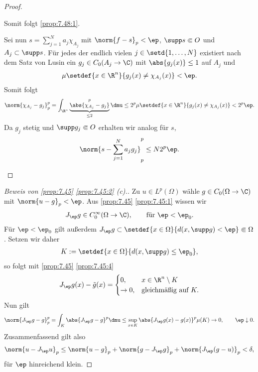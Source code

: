 \begin{proof}
\begin{proofenum}
Somit folgt \ref{prop:7.48:1}.
\item Sei nun $s=\sum_{j=1}^N a_j \chi_{A_j}$ mit $\norm{f-s}_p < \ep$,
$\supp s\Subset O$ und $A_j\subset \supp s$.
Für jedes der endlich vielen $j\in\setd{1,\ldots,N}$ existiert nach dem Satz von
Lusin ein $g_j\in C_0(A_j\to\C)$ mit $\abs{g_j(x)}\le 1$ auf $A_j$ und
\begin{align*}
\mu\setdef{x\in\R^n}{g_j(x)\neq \chi_{A_j}(x)} < \ep.
\end{align*}
Somit folgt
\begin{align*}
\norm{\chi_{A_j}-g_j}_p^p = \int_{\R^n} \underbrace{\abs{\chi_{A_j}-g_j}}_{\le
2}^p
\dmu
\le 2^p
\mu\setdef{x\in\R^n}{g_j(x)\neq \chi_{A_j}(x)}
< 2^p\ep.
\end{align*}
Da $g_j$ stetig und $\supp g_j \Subset O$ erhalten wir
analog für $s$,
\begin{align*}
\norm{s-\sum_{j=1}^N a_j g_j}_p^p \le N2^p\ep.\qedhere
\end{align*}
\end{proofenum}
\end{proof}

\begin{proof}[Beweis von \ref{prop:7.45} \ref{prop:7.45:2} (c).]
Zu $u\in L^p(\Omega)$ wähle $g\in C_0(\Omega\to\C)$ mit $\norm{u-g}_p < \ep$.
Aus \ref{prop:7.45} \ref{prop:7.45:1} wissen wir
\begin{align*}
J_\ep g\in C_0^\infty(\Omega\to\C),\qquad \text{für } \ep < \ep_0.
\end{align*} 
Für $\ep < \ep_0$ gilt außerdem $J_\ep g \subset \setdef{x\in\Omega}{d(x,\supp
g)<\ep}\Subset \Omega$. Setzen wir daher
\begin{align*}
K:= \setdef{x\in\Omega}{d(x,\supp g)\le \ep_0},
\end{align*}
so folgt mit \ref{prop:7.45} \ref{prop:7.45:4}
\begin{align*}
J_\ep g(x) - \tilde{g}(x) =
\begin{cases}
0, & x\in\R^n\setminus K\\
\to 0,& \text{gleichmäßig auf }K.
\end{cases}
\end{align*}
Nun gilt
\begin{align*}
\norm{J_\ep g - g}_{p}^p = 
\int_K \abs{J_\ep g - g}^p \dmu
\le \sup_{x\in K} \abs{J_\ep g(x)-g(x)}^p \mu(K)
\to 0,\qquad \ep\downarrow 0. 
\end{align*}
Zusammenfassend gilt also
\begin{align*}
\norm{u-J_\ep u}_p \le \norm{u-g}_p + \norm{g-J_\ep g}_p + \norm{J_\ep(g-u)}_p
< \delta,
\end{align*}
für $\ep$ hinreichend klein.\qedhere
\end{proof}

